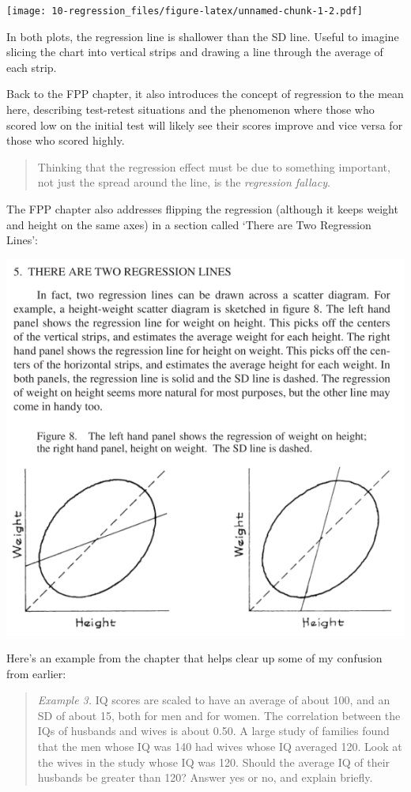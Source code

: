 \documentclass[
]{book}
\begin{document}
\texttt{[image: 10-regression\_files/figure-latex/unnamed-chunk-1-2.pdf]}

In both plots, the regression line is shallower than the SD line. Useful to imagine slicing the chart into vertical strips and drawing a line through the average of each strip.

Back to the FPP chapter, it also introduces the concept of regression to the mean here, describing test-retest situations and the phenomenon where those who scored low on the initial test will likely see their scores improve and vice versa for those who scored highly.

\begin{quote}
Thinking that the regression effect must be due to something important, not just the spread around the line, is the \emph{regression fallacy}.
\end{quote}

The FPP chapter also addresses flipping the regression (although it keeps weight and height on the same axes) in a section called `There are Two Regression Lines':

\includegraphics{images/Ch10Img03.png}

Here's an example from the chapter that helps clear up some of my confusion from earlier:

\begin{quote}
\emph{Example 3.} IQ scores are scaled to have an average of about 100, and an SD of about 15, both for men and for women. The correlation between the IQs of husbands and wives is about 0.50. A large study of families found that the men whose IQ was 140 had wives whose IQ averaged 120. Look at the wives in the study whose IQ was 120. Should the average IQ of their husbands be greater than 120? Answer yes or no, and explain briefly.
\end{quote}
\end{document}
